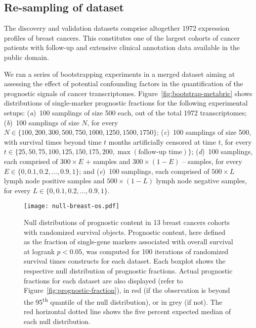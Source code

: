\subsection{Re-sampling of  dataset}
\label{sec:results-prognostic-survival-metabric}

The discovery and validation  datasets comprise altogether
\num{1972} expression profiles of breast cancers.\cite{curtis_genomic_2012} This
constitutes one of the largest cohorts of cancer patients with follow-up and
extensive clinical annotation data available in the public domain.

We ran a series of bootstrapping experiments in a merged 
dataset aiming at assessing the effect of potential confounding factors in the
quantification of the prognostic signals of cancer transcriptomes.
Figure~\ref{fig:bootstrap-metabric} shows distributions of single-marker
prognostic fractions for the following experimental setups: (\emph{a})~\num{100}
samplings of size \num{500} each, out of the total \mbox{1972}
 transcriptomes; (\emph{b})~\num{100} samplings of size $N$,
for every $N \in \{100, 200, 300, 500, 750, 1000, 1250, 1500, 1750\}$;
(\emph{c})~\num{100} samplings of size \num{500}, with survival times
beyond time $t$ months artificially censored at time $t$, for every
$t \in \{25, 50, 75, 100, 125, 150, 175, 200, \max(\text{follow-up time})\}$;
(\emph{d})~\num{100} samplings, each comprised of $300 \times E$ +
samples and $300 \times (1-E)$ -- samples, for every
$E \in \{0, 0.1, 0.2, \ldots{}, 0.9, 1\}$; and (\emph{e})~\num{100} samplings,
each comprised of $500 \times L$ lymph node positive samples and
$500 \times (1-L)$ lymph node negative samples, for every
$L \in \{0, 0.1, 0.2, \ldots{}, 0.9, 1\}$.

\vspace{8\baselineskip}

\begin{figure}
  \texttt{[image: null-breast-os.pdf]}
  \caption[Null distributions of prognostic content in 13 breast cancers cohorts
  with randomized survival objects]{Null distributions of prognostic content in
    13 breast cancers cohorts with randomized survival objects.  Prognostic
    content, here defined as the fraction of single-gene markers associated with
    overall survival at logrank \mbox{$p < 0.05$}, was computed for \num{100}
    iterations of randomized survival times constructs for each dataset.  Each
    boxplot shows the respective null distribution of prognostic fractions.
    Actual prognostic fractions for each dataset are also displayed (refer to
    Figure~\ref{fig:prognostic-fraction}), in red (if the observation is beyond
    the 95\textsuperscript{th} quantile of the null distribution), or in grey
    (if not).  The red horizontal dotted line shows the five percent expected
    median of each null distribution.}
  \label{fig:null-breast-os}%
\end{figure}

